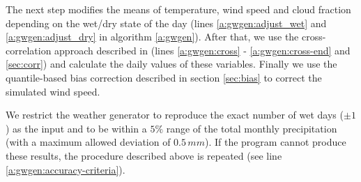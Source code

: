 \begin{refsection}
The next step modifies the means of temperature, wind speed and cloud fraction depending on the wet/dry state of the day (lines \ref{a:gwgen:adjust_wet} and \ref{a:gwgen:adjust_dry} in algorithm \ref{a:gwgen}). After that, we use the cross-correlation approach described in \cite{Richardson1981} (lines \ref{a:gwgen:cross} - \ref{a:gwgen:cross-end} and \autoref{sec:corr}) and calculate the daily values of these variables. Finally we use the quantile-based bias correction described in section \ref{sec:bias} to correct the simulated wind speed.

We restrict the weather generator to reproduce the exact number of wet days ($\pm1$) as the input and to be within a $5\%$ range of the total monthly precipitation (with a maximum allowed deviation of $0.5\,\unit{mm}$). If the program cannot produce these results, the procedure described above is repeated (see line \ref{a:gwgen:accuracy-criteria}).


\end{refsection}
